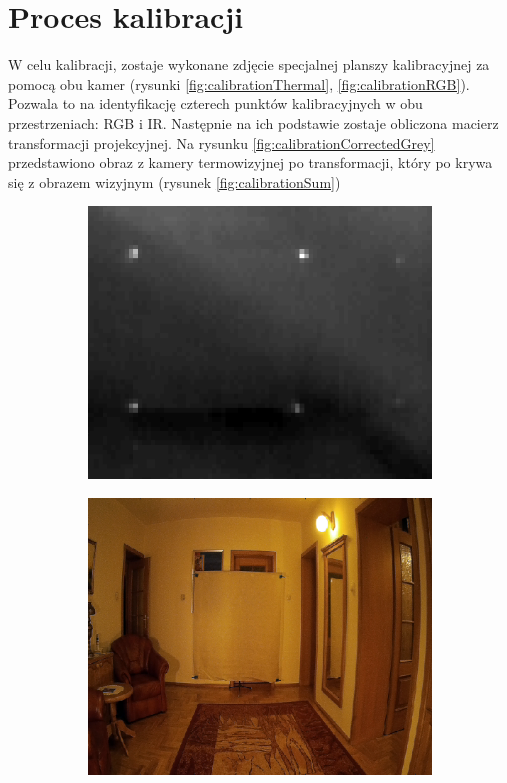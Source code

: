 \section{Proces kalibracji}
W celu kalibracji, zostaje wykonane zdjęcie specjalnej planszy kalibracyjnej za pomocą obu kamer (rysunki \ref{fig:calibrationThermal}, \ref{fig:calibrationRGB}). Pozwala to na identyfikację czterech punktów kalibracyjnych w obu przestrzeniach: RGB i IR. Następnie na ich podstawie zostaje obliczona macierz transformacji projekcyjnej. Na rysunku \ref{fig:calibrationCorrectedGrey} przedstawiono obraz z kamery termowizyjnej po transformacji, który po krywa się z obrazem wizyjnym (rysunek \ref{fig:calibrationSum})

\begin{figure}[h]
	\centering
	\begin{subfigure}{0.47\textwidth}
		\centering
		\includegraphics[width=0.9\linewidth]{images/calibrationThermal}
		\subcaption{\label{fig:calibrationThermal}}
	\end{subfigure}
	\begin{subfigure}{0.47\textwidth}
		\centering
		\includegraphics[width=0.9\linewidth]{images/calibrationRGB}

\end{subfigure}
\end{figure}
